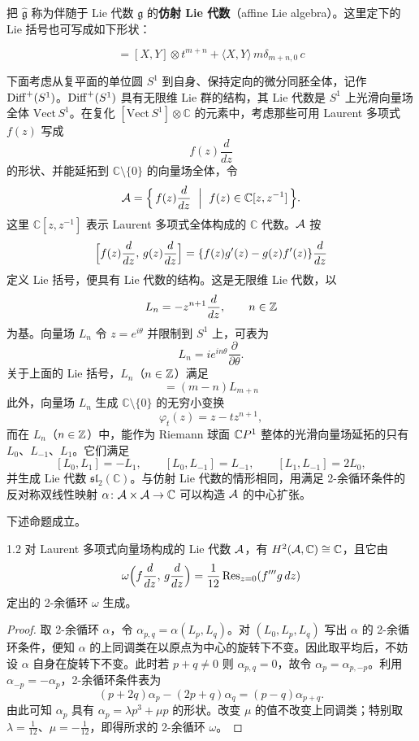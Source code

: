 把 $\widehat{\mathfrak{g}}$ 称为伴随于 Lie 代数 $\mathfrak{g}$ 的\textbf{仿射 Lie 代数}（affine Lie algebra）。这里定下的 Lie 括号也可写成如下形状：

\begin{equation}
  [X\otimes t^{m},\,Y\otimes t^{n}]=[X,Y]\otimes t^{m+n}
  +\langle X,Y\rangle\,m\delta_{m+n,0}\,c \tag{1.4}
\end{equation}

下面考虑从复平面的单位圆 $S^{1}$ 到自身、保持定向的微分同胚全体，记作 $\operatorname{Diff}^{+}(S^{1})$。$\operatorname{Diff}^{+}(S^{1})$ 具有无限维 Lie 群的结构，其 Lie 代数是 $S^{1}$ 上光滑向量场全体 $\mathrm{Vect}\,S^{1}$。在复化 $[\mathrm{Vect}\,S^{1}]\otimes\mathbb{C}$ 的元素中，考虑那些可用 Laurent 多项式 $f(z)$ 写成
\[
  f(z)\frac{d}{dz}
\]
的形状、并能延拓到 $\mathbb{C}\setminus\{0\}$ 的向量场全体，令
\[
  \cA=\Bigl\{\,f(z)\frac{d}{dz}\ \Bigm|\ f(z)\in\mathbb{C}[z,z^{-1}]\,\Bigr\}.
\]
这里 $\mathbb{C}[z,z^{-1}]$ 表示 Laurent 多项式全体构成的 $\mathbb{C}$ 代数。$\mathcal{A}$ 按
\[
  \Bigl[f(z)\frac{d}{dz},\,g(z)\frac{d}{dz}\Bigr]
  =\{f(z)g'(z)-g(z)f'(z)\}\frac{d}{dz}
\]
定义 Lie 括号，便具有 Lie 代数的结构。这是无限维 Lie 代数，以
\[
  L_{n}=-z^{n+1}\frac{d}{dz},\qquad n\in\mathbb{Z}
\]
为基。向量场 $L_{n}$ 令 $z=e^{i\theta}$ 并限制到 $S^{1}$ 上，可表为
\[
  L_{n}=ie^{in\theta}\frac{\partial}{\partial\theta}.
\]
关于上面的 Lie 括号，$L_{n}$（$n\in\mathbb{Z}$）满足
\begin{equation}
  [L_{m},L_{n}]=(m-n)L_{m+n} \tag{1.5}
\end{equation}
此外，向量场 $L_{n}$ 生成 $\mathbb{C}\setminus\{0\}$ 的无穷小变换
\[
  \varphi_{t}(z)=z-tz^{n+1},
\]
而在 $L_{n}$（$n\in\mathbb{Z}$）中，能作为 Riemann 球面 $\mathbb{C}P^{1}$ 整体的光滑向量场延拓的只有 $L_{0}$、$L_{-1}$、$L_{1}$。它们满足
\[
  [L_{0},L_{1}]=-L_{1},\qquad [L_{0},L_{-1}]=L_{-1},\qquad
  [L_{1},L_{-1}]=2L_{0},
\]
并生成 Lie 代数 $\mathfrak{sl}_{2}(\mathbb{C})$。与仿射 Lie 代数的情形相同，用满足 2-余循环条件的反对称双线性映射 $\alpha\colon\mathcal{A}\times\mathcal{A}\to\mathbb{C}$ 可以构造 $\mathcal{A}$ 的中心扩张。

下述命题成立。

\begin{proposition*}{1.2}
  对 Laurent 多项式向量场构成的 Lie 代数 $\mathcal{A}$，有 $H^{2}(\mathcal{A},\mathbb{C})\cong\mathbb{C}$，且它由
  \[
    \omega\Bigl(f\frac{d}{dz},\,g\frac{d}{dz}\Bigr)
    =\frac{1}{12}\,\mathrm{Res}_{z=0}(f'''g\,dz)
  \]
  定出的 2-余循环 $\omega$ 生成。
\end{proposition*}

\begin{proof}
  取 2-余循环 $\alpha$，令 $\alpha_{p,q}=\alpha(L_{p},L_{q})$。对 $(L_{0},L_{p},L_{q})$ 写出 $\alpha$ 的 2-余循环条件，便知 $\alpha$ 的上同调类在以原点为中心的旋转下不变。因此取平均后，不妨设 $\alpha$ 自身在旋转下不变。此时若 $p+q\ne 0$ 则 $\alpha_{p,q}=0$，故令 $\alpha_{p}=\alpha_{p,-p}$。利用 $\alpha_{-p}=-\alpha_{p}$，2-余循环条件表为
  \[
    (p+2q)\alpha_{p}-(2p+q)\alpha_{q}=(p-q)\alpha_{p+q}.
  \]
  由此可知 $\alpha_{p}$ 具有 $\alpha_{p}=\lambda p^{3}+\mu p$ 的形状。改变 $\mu$ 的值不改变上同调类；特别取 $\lambda=\frac{1}{12}$、$\mu=-\frac{1}{12}$，即得所求的 2-余循环 $\omega$。
\end{proof}

